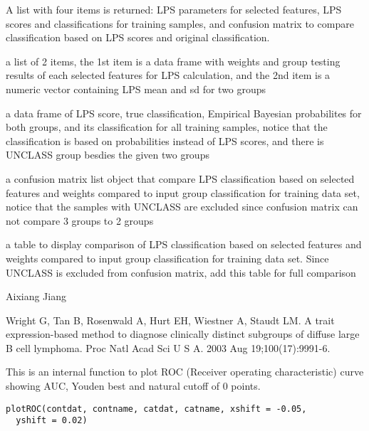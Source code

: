 \documentclass[letterpaper]{book}
\begin{document}
\begin{Value}
A list with four items is returned: LPS parameters for selected features, LPS scores and classifications for training samples, and confusion matrix to compare classification based on LPS scores and original classification.
\begin{ldescription}
\item[\code{LPS\_pars}] a list of 2 items, the 1st item is a data frame with weights and group testing results of each selected features for LPS calculation, and the 2nd item is a numeric vector containing LPS mean and sd for two groups
\item[\code{LPS\_train}] a data frame of LPS score, true classification, Empirical Bayesian probabilites for both groups, and its classification for all training samples, notice that the classification is based on probabilities instead of LPS scores, and there is UNCLASS group besdies the given two groups
\item[\code{classCompare}] a confusion matrix list object that compare LPS classification based on selected features and weights compared to input group classification for training data set, notice that the samples with UNCLASS are excluded since confusion matrix can not compare 3 groups to 2 groups
\item[\code{classTable}] a table to display comparison of LPS classification based on selected features and weights compared to input group classification for training data set. Since UNCLASS is excluded from confusion matrix, add this table for full comparison
\end{ldescription}
\end{Value}
%
\begin{Author}\relax
Aixiang Jiang
\end{Author}
%
\begin{References}\relax
Wright G, Tan B, Rosenwald A, Hurt EH, Wiestner A, Staudt LM. A trait expression-based method
to diagnose clinically distinct subgroups of diffuse large B cell lymphoma. Proc Natl Acad Sci U S
A. 2003 Aug 19;100(17):9991-6.
\end{References}
%
\begin{Description}\relax
This is an internal function to plot ROC (Receiver operating characteristic) curve showing AUC, Youden best and natural cutoff of 0 points.
\end{Description}
%
\begin{Usage}
\begin{verbatim}
plotROC(contdat, contname, catdat, catname, xshift = -0.05,
  yshift = 0.02)
\end{verbatim}
\end{Usage}
\end{document}
